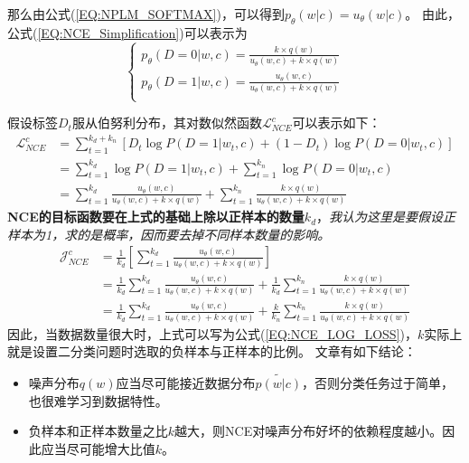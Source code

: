 \documentclass{article}
\begin{document}
那么由公式(\ref{EQ:NPLM_SOFTMAX})，可以得到$p_\theta(w|c) = u_\theta(w|c)$。
由此，公式(\ref{EQ:NCE_Simplification})可以表示为
\begin{equation}
    \begin{cases}
        p_\theta(D=0|w,c) = \frac{k\times q(w)}{u_\theta(w,c)+k\times q(w)}\\
        p_\theta(D=1|w,c) = \frac{u_\theta(w,c)}{u_\theta(w,c)+k\times q(w)}\\
    \end{cases}
    \label{EQ:NCE_Simplification_ReplaceTheta}
\end{equation}

假设标签$D_t$服从伯努利分布，其对数似然函数$\mathcal{L}_{NCE}^c$可以表示如下：
\begin{equation}
    \begin{split}
        \mathcal{L}_{NCE}^c &= \sum_{t=1}^{k_d + k_n} [D_t \log P(D=1|w_t,c) + (1-D_t) \log P(D=0|w_t,c)]\\
        &= \sum_{t=1}^{k_d} \log P(D=1|w_t,c) + \sum_{t=1}^{k_n} \log P(D=0|w_t,c) \\
        &= \sum_{t=1}^{k_d} \frac{u_\theta (w,c)}{u_\theta (w,c) + k \times q(w)} + \sum_{t=1}^{k_n} \frac{k \times q(w)}{u_\theta (w,c) + k \times q(w)}
    \end{split}
\end{equation}
\textbf{NCE的目标函数要在上式的基础上除以正样本的数量$k_d$}，\emph{我认为这里是要假设正样本为1，求的是概率，因而要去掉不同样本数量的影响。}
\begin{equation}
    \begin{split}
        \mathcal{J}_{NCE}^{c} &= \frac{1}{k_d} [\sum_{t=1}^{k_d} \frac{u_\theta (w,c)}{u_\theta (w,c) + k \times q(w)}] \\
        &= \frac{1}{k_d} \sum_{t=1}^{k_d} \frac{u_\theta (w,c)}{u_\theta (w,c) + k \times q(w)} + \frac{1}{k_d} \sum_{t=1}^{k_n} \frac{k \times q(w)}{u_\theta (w,c) + k \times q(w)}\\
        &= \frac{1}{k_d} \sum_{t=1}^{k_d} \frac{u_\theta (w,c)}{u_\theta (w,c) + k \times q(w)} + \frac{k}{k_n} \sum_{t=1}^{k_n} \frac{k \times q(w)}{u_\theta (w,c) + k \times q(w)}
    \end{split}
\end{equation}
因此，当数据数量很大时，上式可以写为公式(\ref{EQ:NCE_LOG_LOSS})，$k$实际上就是设置二分类问题时选取的负样本与正样本的比例。
文章\cite{DBLP:journals/jmlr/GutmannH12}有如下结论：
\begin{itemize}
    \item 噪声分布$q(w)$应当尽可能接近数据分布$\tilde{p(w|c)}$，否则分类任务过于简单，也很难学习到数据特性。
    \item 负样本和正样本数量之比$k$越大，则NCE对噪声分布好坏的依赖程度越小。因此应当尽可能增大比值$k$。
\end{itemize}
\end{document}
